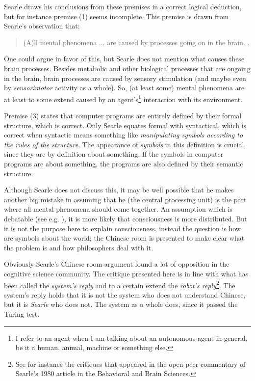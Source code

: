Searle draws his conclusions from these premises in a correct logical deduction, but for instance premise (1) seems incomplete. This premise is drawn from Searle's observation that:

\begin{quote}
(A)ll mental phenomena ... are caused by processes going on in the brain. \cite[p. 18]{searle:1984}.
\end{quote}

One could argue in favor of this, but Searle does not mention what causes these brain processes. Besides metabolic and other biological processes that are ongoing in the brain, brain processes are caused by sensory stimulation (and maybe even by {\em sensorimotor} activity as a whole). So, (at least some) mental phenomena are at least to some extend caused by an agent's\footnote{I refer to an agent when I am talking about an autonomous agent in general, be it a human, animal, machine or something else.} interaction with its environment.

Premise (3) states that computer programs are entirely defined by their formal structure, which is correct. Only Searle equates formal with syntactical, which is correct when syntactic means something like {\em manipulating symbols according to the rules of the structure}. The appearance of {\em symbols} in this definition is crucial, since they are by definition about something. If the symbols in computer programs are about something, the programs are also defined by their semantic structure.

Although Searle does not discuss this, it may be well possible that he makes another big mistake in assuming that he (the central processing unit) is the part where all mental phenomena should come together. An assumption which is debatable (see e.g. \cite{dennett:1991,edelman:1992}), it is more likely that consciousness is more distributed. But it is not the purpose here to explain consciousness, instead the question is how are symbols about the world; the Chinese room is presented to make clear what the problem is and how philosophers deal with it.

Obviously Searle's Chinese room argument found a lot of opposition in the cognitive science community. The critique presented here is in line with what has been called the {\em system's reply} and to a certain extend the {\em robot's reply}\footnote{See for instance the critiques that appeared in the open peer commentary of Searle's 1980 article in the Behavioral and Brain Sciences.}. The system's reply holds that it is not the system who does not understand Chinese, but it is {\em Searle} who does not. The system as a whole does, since it passed the Turing test. 

